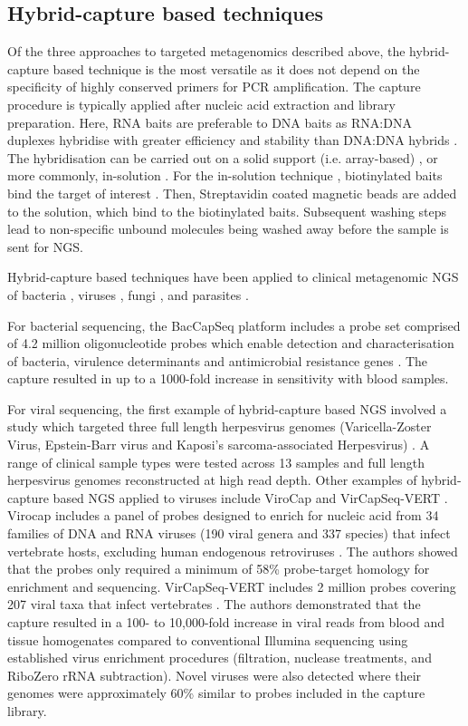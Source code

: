 \subsection{Hybrid-capture based techniques}
Of the three approaches to targeted metagenomics described above, the hybrid-capture based technique is the most versatile as it does not depend on the specificity of highly conserved primers for PCR amplification. The capture procedure is typically applied after nucleic acid extraction and library preparation. Here, RNA baits are preferable to DNA baits as RNA:DNA duplexes hybridise with greater efficiency and stability than DNA:DNA hybrids \parencite{Lesnik1995}. The hybridisation can be carried out on a solid support (i.e. array-based) \parencite{Schuenemann2018}, or more commonly, in-solution \parencite{Briese2015}. For the in-solution technique , biotinylated baits bind the target of interest \parencite{Gnirke2009}. Then, Streptavidin coated magnetic beads are added to the solution, which bind to the biotinylated baits. Subsequent washing steps lead to non-specific unbound molecules being washed away before the sample is sent for NGS. 

Hybrid-capture based techniques have been applied to clinical metagenomic NGS of bacteria \parencite{Allicock2018}, viruses \parencite{Depledge2011} \parencite{Briese2015} \parencite{Wylie2015}, fungi \parencite{Amorim-Vaz2015}, and parasites \parencite{Bright2012}. 

For bacterial sequencing, the BacCapSeq platform includes a probe set comprised of 4.2 million oligonucleotide probes which enable detection and characterisation of bacteria, virulence determinants and antimicrobial resistance genes \parencite{Allicock2018}. The capture resulted in up to a 1000-fold increase in sensitivity with blood samples.

For viral sequencing, the first example of hybrid-capture based NGS involved a study which targeted three full length herpesvirus genomes (Varicella-Zoster Virus, Epstein-Barr virus and Kaposi's sarcoma-associated Herpesvirus) \parencite{Depledge2011}. A range of clinical sample types were tested across 13 samples and full length herpesvirus genomes reconstructed at high read depth. Other examples of hybrid-capture based NGS applied to viruses include ViroCap \parencite{Wylie2015} and VirCapSeq-VERT \parencite{Briese2015}. Virocap includes a panel of probes designed to enrich for nucleic acid from 34 families of DNA and RNA viruses (190 viral genera and 337 species) that infect vertebrate hosts, excluding human endogenous retroviruses \parencite{Wylie2015}. The authors showed that the probes only required a minimum of 58\% probe-target homology for enrichment and sequencing. VirCapSeq-VERT includes 2 million probes covering 207 viral taxa that infect vertebrates \parencite{Briese2015}. The authors demonstrated that the capture resulted in a 100- to 10,000-fold increase in viral reads from blood and tissue homogenates compared to conventional Illumina sequencing using established virus enrichment procedures (filtration, nuclease treatments, and RiboZero rRNA subtraction). Novel viruses were also detected where their genomes were approximately 60\% similar to probes included in the capture library.

